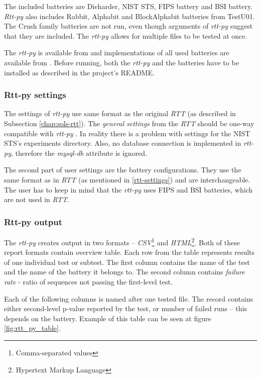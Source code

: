 \documentclass[
  digital,     %
  oneside,     %
  nosansbold,  %
  nocolorbold, %
  nolof,         %
  nolot,         %
]{fithesis4}
\begin{document}
The included batteries are Dieharder, NIST STS, FIPS battery and BSI battery. \emph{Rtt-py} also includes Rabbit, Alphabit and BlockAlphabit batteries from TestU01. The Crush family batteries are not run, even though arguments of \emph{rtt-py} suggest that they are included. The \emph{rtt-py} allows for multiple files to be tested at once.


The \emph{rtt-py} is available from \cite{rtt-py-site} and implementations of all used batteries are available from \cite{rtt-py-batteries}. Before running, both the \emph{rtt-py} and the batteries have to be installed as described in the project's README.



\subsubsection{Rtt-py settings}
The settings of \emph{rtt-py} use same format as the original \emph{RTT} (as described in Subsection \ref{chap:sols-rtt}). The \emph{general settings} from the \emph{RTT} should be one-way compatible with \emph{rtt-py} \cite[p. 25]{vavercak}. In reality there is a problem with settings for the NIST STS's experiments directory. Also, no database connection is implemented in \emph{rtt-py}, therefore the \emph{mysql-db} attribute is ignored. \cite{rtt-py-site}

The second part of user settings are the battery configurations. They use the same format as in \emph{RTT} (as mentioned in \ref{rtt-settings}) and are interchangeable.~\cite[p.~25]{vavercak} The user has to keep in mind that the \emph{rtt-py} uses FIPS and BSI batteries, which are not used in \emph{RTT}. 

\subsubsection{Rtt-py output}
The \emph{rtt-py} creates output in two formats -- \emph{CSV}\footnote{Comma-separated values} and \emph{HTML}\footnote{Hypertext Markup Language}. \cite[p. 36]{vavercak} Both of these report formats contain overview table. Each row from the table represents results of one individual test or subtest. The first column contains the name of the test and the name of the battery it belongs to. The second column contains \emph{failure rate} - ratio of sequences not passing the first-level test.

Each of the following columns is named after one tested file. The record contains either second-level p-value reported by the test, or number of failed runs -- this depends on the battery. Example of this table can be seen at figure \ref{fig:rtt_py_table}.
\end{document}
